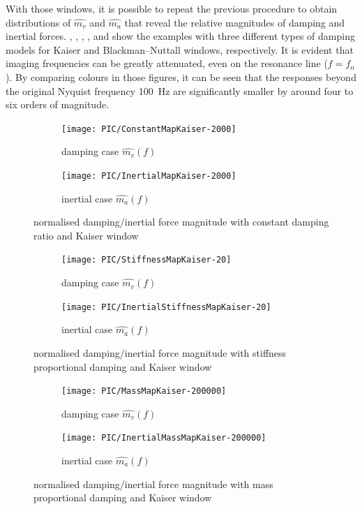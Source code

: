 With those windows, it is possible to repeat the previous procedure to obtain distributions of $\hat{m_v}$ and $\hat{m_a}$ that reveal the relative magnitudes of damping and inertial forces. , , , ,  and  show the examples with three different types of damping models for Kaiser and Blackman--Nuttall windows, respectively. It is evident that imaging frequencies can be greatly attenuated, even on the resonance line ($f=f_n$). By comparing colours in those figures, it can be seen that the responses beyond the original Nyquist frequency \SI{100}{\hertz} are significantly smaller by around four to six orders of magnitude.
\begin{figure}[htb!]
\centering
\begin{subfigure}{.48\textwidth}
\texttt{[image: PIC/ConstantMapKaiser-2000]}
\caption{damping case $\hat{m_v}\left(f\right)$}
\end{subfigure}
\begin{subfigure}{.48\textwidth}
\texttt{[image: PIC/InertialMapKaiser-2000]}
\caption{inertial case $\hat{m_a}\left(f\right)$}
\end{subfigure}
\caption{normalised damping/inertial force magnitude with constant damping ratio and Kaiser window}\label{fig:map_constant_kaiser}
\end{figure}
\begin{figure}[htb!]
\centering
\begin{subfigure}{.48\textwidth}
\texttt{[image: PIC/StiffnessMapKaiser-20]}
\caption{damping case $\hat{m_v}\left(f\right)$}
\end{subfigure}
\begin{subfigure}{.48\textwidth}
\texttt{[image: PIC/InertialStiffnessMapKaiser-20]}
\caption{inertial case $\hat{m_a}\left(f\right)$}
\end{subfigure}
\caption{normalised damping/inertial force magnitude with stiffness proportional damping and Kaiser window}\label{fig:map_stiffness_kaiser}
\end{figure}
\begin{figure}[htb!]
\centering
\begin{subfigure}{.48\textwidth}
\texttt{[image: PIC/MassMapKaiser-200000]}
\caption{damping case $\hat{m_v}\left(f\right)$}
\end{subfigure}
\begin{subfigure}{.48\textwidth}
\texttt{[image: PIC/InertialMassMapKaiser-200000]}
\caption{inertial case $\hat{m_a}\left(f\right)$}
\end{subfigure}
\caption{normalised damping/inertial force magnitude with mass proportional damping and Kaiser window}\label{fig:map_mass_kaiser}
\end{figure}
